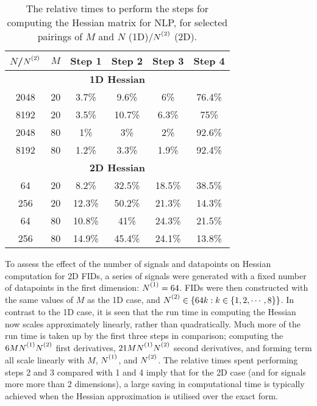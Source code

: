 \begin{table}
    \begin{center}
        \begin{tabular}{ c c c c c c }
            \toprule
            $N$/$\Ntwo$ &
            $M$ &
            Step 1 &
            Step 2 &
            Step 3 &
            Step 4 \\
            \midrule
            \multicolumn{6}{c}{\textbf{1D Hessian}}\\
            \midrule
            2048 & 20 & 3.7\% & 9.6\% & 6\% & 76.4\% \\
            8192 & 20 & 3.5\% & 10.7\% & 6.3\% & 75\% \\
            2048 & 80 & 1\% & 3\% & 2\% & 92.6\% \\
            8192 & 80 & 1.2\% & 3.3\% & 1.9\% & 92.4\% \\
            \midrule
            \multicolumn{6}{c}{\textbf{2D Hessian}}\\
            \midrule
            64 & 20 & 8.2\% & 32.5\% & 18.5\% & 38.5\% \\
            256 & 20 & 12.3\% & 50.2\% & 21.3\% & 14.3\% \\
            64 & 80 & 10.8\% & 41\% & 24.3\% & 21.5\% \\
            256 & 80 & 14.9\% & 45.4\% & 24.1\% & 13.8\% \\
            \bottomrule
        \end{tabular}
    \end{center}
    \caption[
        The relative times to perform the steps for computing the Hessian
        matrix for \acs{NLP}.
    ]{
        The relative times to perform the steps for computing the Hessian
        matrix for \acs{NLP}, for selected pairings of $M$ and $N$
        (\ac{1D})/$\Ntwo$ (\ac{2D}).
    }
    \label{tab:hess-steps}
\end{table}

To assess the effect of the number of signals and datapoints on Hessian
computation for \ac{2D} \acp{FID}, a series of signals were generated with a
fixed number of datapoints in the first dimension: $\None = 64$. \acp{FID} were
then constructed with the same values of $M$ as the \ac{1D} case, and $\Ntwo
\in \lbrace 64k : k \in \lbrace 1, 2, \cdots, 8 \rbrace \rbrace$. In contrast to
the \ac{1D} case, it is seen that the run time in computing the Hessian now
scales approximately linearly, rather than quadratically. Much more of the run
time is taken up by the first three steps in comparison; computing the
$6M\None\Ntwo$ first derivatives, $21M\None\Ntwo$ second derivatives, and
forming term  all scale linearly with $M$, $\None$, and $\Ntwo$. The
relative times spent performing steps 2 and 3 compared with 1 and 4 imply that for
the \ac{2D} case (and for signals more more than 2 dimensions), a large saving
in computational time is typically achieved when the Hessian approximation
is utilised over the exact form.

